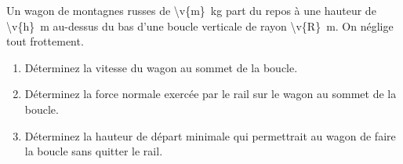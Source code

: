 Un wagon de montagnes russes de \qty{\v{m}}{kg} part du repos à une hauteur de \qty{\v{h}}{m} au-dessus du bas d'une boucle verticale de rayon \qty{\v{R}}{m}. On néglige tout frottement.

\begin{enumerate}[label=\alph*)]
    \item Déterminez la vitesse du wagon au sommet de la boucle.
    \item Déterminez la force normale exercée par le rail sur le wagon au sommet de la boucle.
    \item Déterminez la hauteur de départ minimale qui permettrait au wagon de faire la boucle sans quitter le rail.
\end{enumerate}
